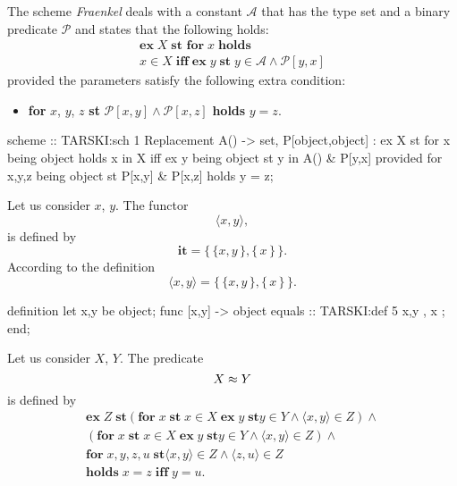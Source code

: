 \begin{paracol}{2}
\switchcolumn*
\ensurevspace{5cm}

The scheme \textit{Fraenkel} deals with a constant $\mathcal{A}$ that
has the type set and a binary predicate $\mathcal{P}$ and states that
the following holds:
\begin{multline*}
  \textbf{ex}\; X\;\textbf{st\ for}\;x\;\textbf{holds}\\
  x\in X\;\textbf{iff}\;
\textbf{ex}\;y\;\textbf{st}\;y\in\mathcal{A}\land\mathcal{P}[y,x]
\end{multline*}
provided the parameters satisfy the following extra condition:
\begin{itemize}
\item \textbf{for} $x$, $y$, $z$ \textbf{st}
  $\mathcal{P}[x,y]\land\mathcal{P}[x,z]$ \textbf{holds} $y=z$.
\end{itemize}

\switchcolumn

\begin{mizar}
scheme :: TARSKI:sch 1
 Replacement{ A() -> set,
              P[object,object] }:
 ex X
 st for x being object 
    holds x in X iff
          ex y being object 
          st y in A() & P[y,x]
provided
 for x,y,z being object 
 st P[x,y] & P[x,z]
 holds y = z;
\end{mizar}

\switchcolumn*
\ensurevspace{5cm}

Let us consider $x$, $y$. The functor
\[\langle x,y\rangle,\]
is defined by
\[\textbf{it} = \{\,\{x,y\,\},\{\,x\,\}\,\}.\]
According to the definition
\begin{equation}
\langle x,y\rangle = \{\,\{x,y\,\},\{\,x\,\}\,\}.
\end{equation}

\switchcolumn
\begin{mizar}
definition
  let x,y be object;
  func [x,y] -> object equals
:: TARSKI:def 5
    { { x,y }, { x } };
end;
\end{mizar}

\switchcolumn*
\ensurevspace{5cm}

Let us consider $X$, $Y$. The predicate
\[X\approx Y\]
is defined by
\begin{multline*}
\textbf{ex}\;Z\;\textbf{st}(\textbf{for}\;x\;\textbf{st}\;x\in X\;\textbf{ex}\;
y\;\textbf{st}y\in Y\land\langle x,y\rangle\in Z)\land\\
(\textbf{for}\;x\;\textbf{st}\;x\in X\;\textbf{ex}\;
y\;\textbf{st}y\in Y\land\langle x,y\rangle\in Z)\land\\
\textbf{for}\;x,y,z,u\;\textbf{st}\langle x,y\rangle\in Z\land\langle z,u\rangle\in Z\\
\textbf{holds}\;x=z\;\textbf{iff}\;y=u.
\end{multline*}
\


\end{paracol}
